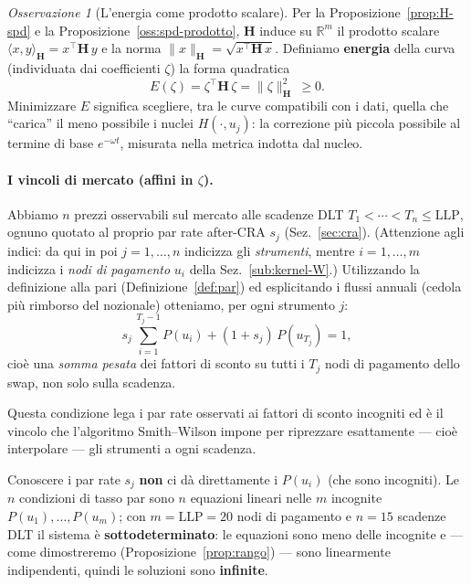 \documentclass[11pt,a4paper]{article}
\theoremstyle{plain}
\theoremstyle{definition}
\theoremstyle{remark}
\newtheorem*{osservazione}{Osservazione}
\newcommand{\LLP}{\mathrm{LLP}}
\newcommand{\Hmat}{\mathbf{H}}
\newcommand{\transp}{^{\!\top}}
\begin{document}
\begin{osservazione}[L'energia come prodotto scalare]
\label{oss:energia}
Per la Proposizione~\ref{prop:H-spd} e la Proposizione~\ref{oss:spd-prodotto}, $\Hmat$
induce su $\mathbb{R}^m$ il prodotto scalare
$\langle x,y\rangle_{\Hmat} = x\transp\Hmat\,y$ e la norma
$\|x\|_{\Hmat} = \sqrt{x\transp\Hmat\,x}$.
Definiamo \textbf{energia} della curva (individuata dai coefficienti $\zeta$) la forma quadratica
\[
  E(\zeta) = \zeta\transp \Hmat\, \zeta = \|\zeta\|_{\Hmat}^2 \ \ge 0 .
\]
Minimizzare $E$ significa scegliere, tra le curve compatibili con i dati, quella che ``carica''
il meno possibile i nuclei $H(\cdot,u_j)$: la correzione pi\`u piccola possibile al termine di
base $e^{-\omega t}$, misurata nella metrica indotta dal nucleo.
\end{osservazione}

\paragraph{I vincoli di mercato (affini in $\zeta$).}
Abbiamo $n$ prezzi osservabili sul mercato alle scadenze DLT $T_1<\cdots<T_n\le\LLP$, ognuno
quotato al proprio par rate after-CRA $s_j$ (Sez.~\ref{sec:cra}). (Attenzione agli indici: da
qui in poi $j=1,\dots,n$ indicizza gli \emph{strumenti}, mentre $i=1,\dots,m$ indicizza i
\emph{nodi di pagamento} $u_i$ della Sez.~\ref{sub:kernel-W}.) Utilizzando la definizione alla
pari (Definizione~\ref{def:par}) ed esplicitando i flussi annuali (cedola pi\`u rimborso del
nozionale) otteniamo, per ogni strumento $j$:
\[
  s_j\,\sum_{i=1}^{T_j-1} P(u_i) + (1+s_j)\,P(u_{T_j}) = 1,
\]
cio\`e una \emph{somma pesata} dei fattori di sconto su tutti i $T_j$ nodi di pagamento dello
swap, non solo sulla scadenza.

Questa condizione lega i par rate osservati ai fattori di sconto incogniti ed \`e il vincolo che
l'algoritmo Smith--Wilson impone per riprezzare esattamente --- cio\`e interpolare --- gli
strumenti a ogni scadenza.

Conoscere i par rate $s_j$ \textbf{non} ci d\`a direttamente i
$P(u_i)$ (che sono incogniti). Le $n$ condizioni di tasso par sono $n$ equazioni lineari nelle $m$
incognite $P(u_1),\ldots,P(u_m)$; con $m = \LLP = 20$ nodi di pagamento e $n = 15$ scadenze
DLT il sistema \`e \textbf{sottodeterminato}: le equazioni sono meno delle incognite e ---
come dimostreremo (Proposizione~\ref{prop:rango}) --- sono linearmente indipendenti, quindi
le soluzioni sono \textbf{infinite}.
\end{document}
